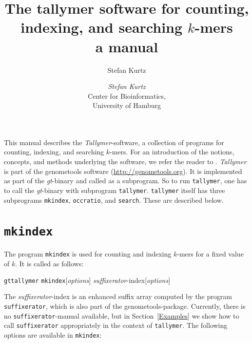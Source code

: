 \documentclass[12pt]{article}
\title{The tallymer software for counting, indexing, and searching $k$-mers\\
a manual}
\author{Stefan Kurtz}
\author{\begin{tabular}{c}
         \textit{Stefan Kurtz}\\
         Center for Bioinformatics,\\
         University of Hamburg
        \end{tabular}}
\newcommand{\Programname}[1]{\texttt{\small #1}}
\newcommand{\Tallymer}[0]{\Programname{tallymer}\xspace}
\newcommand{\TYmkindex}[0]{\Programname{mkindex}\xspace}
\newcommand{\TYsearch}[0]{\Programname{search}\xspace}
\newcommand{\TYoccratio}[0]{\Programname{occratio}\xspace}
\newcommand{\SFX}[0]{\Programname{suffixerator}\xspace}
\newcommand{\SFXidx}[0]{\textit{suffixerator}-index\xspace}
\newcommand{\GT}[0]{\Programname{gt}\xspace}
\newcommand{\Typrogintro}[1]{
\par
\noindent\GT \Programname{tallymer} #1\xspace [\textit{options}] \Showoption{esa}
\SFXidx [\textit{options}]
\par
The \SFXidx is an enhanced suffix array computed by the
program \SFX, which is also part of the genometools-package. Currently,
there is no \SFX-manual available, but in Section~\ref{Examples} we show how
to call \SFX appropriately in  the context of
\Tallymer. The following options are available in #1:}
\begin{document}
\maketitle
This manual describes the \textit{Tallymer}-software, a collection of programs
for counting, indexing, and searching $k$-mers. For an introduction of
the notions, concepts, and methods underlying the software, we refer
the reader to \cite{KUR:NER:STE:WAR:2008}. \textit{Tallymer} is part of
the genometools software (\url{http://genometools.org}). It is implemented
as part of the \textit{gt}-binary and called as a subprogram. So to
run \Tallymer, one has to call the \textit{gt}-binary with subprogram
\texttt{tallymer}. \Tallymer itself has three subprograms
\TYmkindex, \TYoccratio, and \TYsearch. These are described below.

\section{\TYmkindex}
The program \TYmkindex is used for counting and indexing \(k\)-mers for
a fixed value of \(k\). It is called as follows:
\par
\Typrogintro{\TYmkindex}
\end{document}
